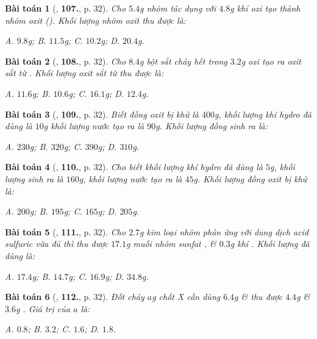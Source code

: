 \documentclass{article}
\numberwithin{equation}{section}
\newtheorem{baitoan}{Bài toán}
\begin{document}
\begin{baitoan}[\cite{An2011}, \textbf{107.}, p. 32]
	Cho $5.4$g nhôm tác dụng với $4.8$g khí oxi tạo thành nhôm oxit (). Khối lượng nhôm oxit thu được là:
	
		{\sf A.} $9.8$g;
		{\sf B.} $11.5$g;
		{\sf C.} $10.2$g;
		{\sf D.} $20.4$g.
	
\end{baitoan}

\begin{baitoan}[\cite{An2011}, \textbf{108.}, p. 32]
	Cho $8.4$g bột sắt cháy hết trong $3.2$g oxi tạo ra oxit sắt từ . Khối lượng oxit sắt từ thu được là:
	
		{\sf A.} $11.6$g;
		{\sf B.} $10.6$g;
		{\sf C.} $16.1$g;
		{\sf D.} $12.4$g.
	
\end{baitoan}

\begin{baitoan}[\cite{An2011}, \textbf{109.}, p. 32]
	Biết đồng oxit  bị khử là $400$g, khối lượng khí hydro đã dùng là $10$g khối lượng nước tạo ra là $90$g. Khối lượng đồng sinh ra là:
	
		{\sf A.} $230$g;
		{\sf B.} $320$g;
		{\sf C.} $390$g;
		{\sf D.} $310$g.
	
\end{baitoan}

\begin{baitoan}[\cite{An2011}, \textbf{110.}, p. 32]
	Cho biết khối lượng khí hydro đã dùng là $5$g, khối lượng  sinh ra là $160$g, khối lượng nước tạo ra là $45$g. Khối lượng đồng oxit bị khử là:
	
		{\sf A.} $200$g;
		{\sf B.} $195$g;
		{\sf C.} $165$g;
		{\sf D.} $205$g.
	
\end{baitoan}

\begin{baitoan}[\cite{An2011}, \textbf{111.}, p. 32]
	Cho $2.7$g kim loại nhôm phản ứng với dung dịch acid sulfuric  vừa đủ thì thu được $17.1$g muối nhôm sunfat , \& $0.3$g khí . Khối lượng  đã dùng là:
	
		{\sf A.} $17.4$g;
		{\sf B.} $14.7$g;
		{\sf C.} $16.9$g;
		{\sf D.} $34.8$g.
	
\end{baitoan}

\begin{baitoan}[\cite{An2011}, \textbf{112.}, p. 32]
	Đốt cháy $a$g chất X cần dùng $6.4$g  \& thu được $4.4$g  \& $3.6$g . Giá trị của $a$ là:
	
		{\sf A.} $0.8$;
		{\sf B.} $3.2$;
		{\sf C.} $1.6$;
		{\sf D.} $1.8$.
	
\end{baitoan}
\end{document}
